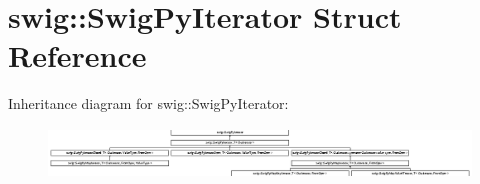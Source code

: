 \hypertarget{structswig_1_1_swig_py_iterator}{}\section{swig\+:\+:Swig\+Py\+Iterator Struct Reference}
\label{structswig_1_1_swig_py_iterator}
Inheritance diagram for swig\+:\+:Swig\+Py\+Iterator\+:\begin{figure}[H]
\begin{center}
\leavevmode
\includegraphics[height=1.313321cm]{structswig_1_1_swig_py_iterator}
\end{center}
\end{figure}
